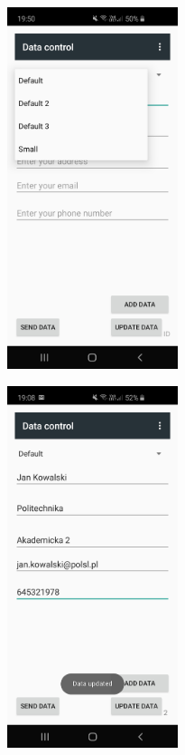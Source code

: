 \documentclass[a4paper,12pt, twoside]{article}
\begin{document}
\begin{enumerate}
\begin{figure}[H]
    	        \begin{minipage}{.5\textwidth}
    	            \centering
    	            \includegraphics[width=5cm]{images/view_dataControl.jpg}
                    \label{fig:dataControl}
                \end{minipage}%
                \begin{minipage}{.5\textwidth}
                    \centering
    	            \includegraphics[width=5cm]{images/view_dataEdit.jpg}

\end{minipage}
\end{figure}
\end{enumerate}
\end{document}
